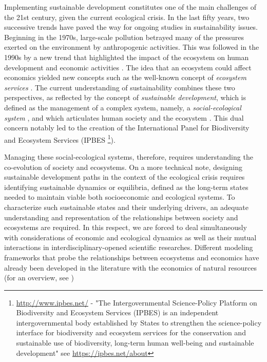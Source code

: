 Implementing sustainable development constitutes one of the main challenges of the 21st century, given the current ecological crisis.  In the last fifty years, two successive trends have paved the way for ongoing studies in sustainability issues. Beginning in the 1970s, large-scale pollution betrayed many of the pressures exerted on the environment by anthropogenic activities. This was followed in the 1990s by a new trend that highlighted the impact of the ecosystem on human development and economic activities \citep{Costanza1997}. The idea that an ecosystem could affect economics yielded new concepts such as the well-known concept of \textit{ecosystem services} \citep{Daily97b,MEA2005,Bateman2013}. The current understanding of sustainability combines these two perspectives, as reflected by the concept of \textit{sustainable development}, which is defined as the management of a complex system, namely, a \textit{social-ecological system} \citep{Ostrom2009}, and which articulates human society and the ecosystem \citep{Dasgupta2007}. This dual concern notably led to the creation of the International Panel for Biodiversity and Ecosystem Services (IPBES \footnote{\url{http://www.ipbes.net/} - "The Intergovernmental Science-Policy Platform on Biodiversity and Ecosystem Services (IPBES) is an independent intergovernmental body established by States to strengthen the science-policy interface for biodiversity and ecosystem services for the conservation and sustainable use of biodiversity, long-term human well-being and sustainable development" see \url{https://ipbes.net/about}}).
 
Managing these social-ecological systems, therefore, requires understanding the co-evolution of society and ecosystems. On a more technical note, designing sustainable development paths in the context of the ecological crisis requires identifying sustainable dynamics or equilibria, defined as the long-term states needed to maintain viable both socioeconomic and ecological systems. 
To characterize such sustainable states and their underlying drivers, an adequate understanding and representation of the relationships between society and ecosystems are required. In this respect, we are forced to deal simultaneously with considerations of economic and ecological dynamics as well as their mutual interactions in interdisciplinary-opened scientific researches. Different modeling frameworks that probe the relationships between ecosystems and economics have already been developed in the literature with the economics of natural resources (for an overview, see \cite{Halvorsen2015}) 

